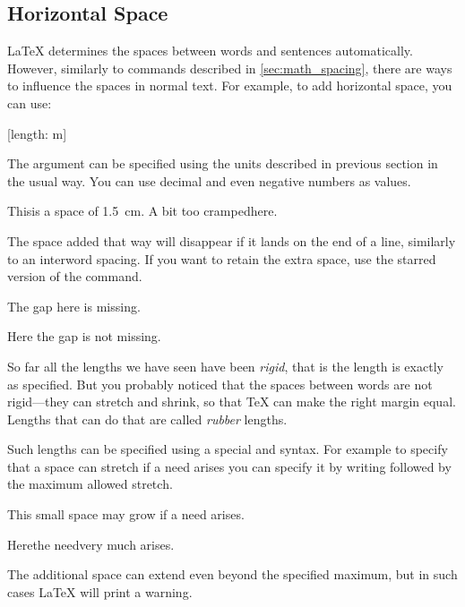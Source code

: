 \subsection{Horizontal Space}\label{sec:hspace}

\LaTeX{} determines the spaces between words and sentences automatically.
However, similarly to commands described in \autoref{sec:math_spacing}, there are
ways to influence the spaces in normal text. For example, to add horizontal
space, you can use:
\begin{lscommand}
  [length: m]
\end{lscommand}
The  argument can be specified using the units described in previous
section in the usual way. You can use decimal and even negative numbers as
values.
\begin{example}
This\hspace{1.5cm}is a space
of \qty{1.5}{\cm}. A bit too
cramped\hspace{-5pt}here.
\end{example}
The space added that way will disappear if it lands on the end of a line,
similarly to an interword spacing. If you want to retain the extra space, use the
starred version of the command.
\begin{example}
The gap here is\hspace{1cm}%
\linebreak missing.

Here the gap is\hspace*{1cm}%
\linebreak not missing.
\end{example}

So far all the lengths we have seen have been \emph{rigid}, that is the length is exactly as specified. But
you probably noticed that the spaces between words are not rigid---they can
stretch and shrink, so that \TeX{} can make the right margin equal. Lengths
that can do that are called \emph{rubber} lengths.

Such lengths can be specified using a special  and 
syntax. For example to specify that a space can stretch if a need arises you
can specify it by writing  followed by the maximum allowed stretch.
\begin{example}
This small\hspace{1em plus 2cm}%
space may grow if a need arises.

Here\hspace{1em plus 2cm}the
need\linebreak very much arises.
\end{example}
The additional space can extend even beyond the specified maximum, but in such
cases \LaTeX{} will print a warning.

